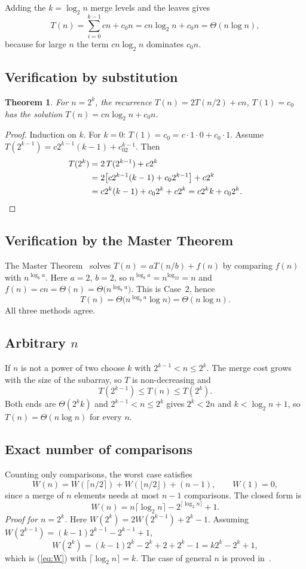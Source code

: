 \documentclass[11pt,a4paper]{article}
\theoremstyle{plain}
\newtheorem{theorem}{Theorem}
\theoremstyle{definition}
\renewcommand{\lg}{\log_2}
\begin{document}
Adding the $k=\lg n$ merge levels and the leaves gives
\[
  T(n)=\sum_{i=0}^{k-1}cn+c_0n=cn\lg n+c_0n=\Theta(n\log n),
\]
because for large $n$ the term $cn\lg n$ dominates $c_0n$.

\subsection{Verification by substitution}
\begin{theorem}\label{thm:subst}
For $n=2^k$, the recurrence $T(n)=2T(n/2)+cn$, $T(1)=c_0$ has the solution $T(n)=cn\lg n+c_0n$.
\end{theorem}
\begin{proof}
Induction on $k$. For $k=0$: $T(1)=c_0=c\cdot1\cdot0+c_0\cdot1$. Assume $T(2^{k-1})=c2^{k-1}(k-1)+c_02^{k-1}$. Then
\begin{align*}
T(2^k)&=2\,T(2^{k-1})+c2^k\\
&=2\bigl[c2^{k-1}(k-1)+c_02^{k-1}\bigr]+c2^k\\
&=c2^k(k-1)+c_02^k+c2^k=c2^kk+c_02^k. \qedhere
\end{align*}
\end{proof}

\subsection{Verification by the Master Theorem}
The Master Theorem~\cite{clrs,bentley} solves $T(n)=aT(n/b)+f(n)$ by comparing $f(n)$ with $n^{\log_ba}$. Here $a=2$, $b=2$, so $n^{\log_ba}=n^{\log_22}=n$ and $f(n)=cn=\Theta(n)=\Theta\bigl(n^{\log_ba}\bigr)$. This is Case~2, hence
\[
  T(n)=\Theta\bigl(n^{\log_ba}\log n\bigr)=\Theta(n\log n).
\]
All three methods agree.

\subsection{Arbitrary $n$}
If $n$ is not a power of two choose $k$ with $2^{k-1}<n\le2^k$. The merge cost grows with the size of the subarray, so $T$ is non-decreasing and
\[
  T(2^{k-1})\le T(n)\le T(2^k).
\]
Both ends are $\Theta(2^k k)$ and $2^{k-1}<n\le2^k$ gives $2^k<2n$ and $k<\lg n+1$, so $T(n)=\Theta(n\log n)$ for every $n$.

\subsection{Exact number of comparisons}
Counting only comparisons, the worst case satisfies
\[
  W(n)=W(\lceil n/2\rceil)+W(\lfloor n/2\rfloor)+(n-1),\qquad W(1)=0,
\]
since a merge of $n$ elements needs at most $n-1$ comparisons. The closed form is
\begin{equation}
  W(n)=n\lceil\lg n\rceil-2^{\lceil\lg n\rceil}+1.
  \label{eq:W}
\end{equation}
\emph{Proof for $n=2^k$.} Here $W(2^k)=2W(2^{k-1})+2^k-1$. Assuming $W(2^{k-1})=(k-1)2^{k-1}-2^{k-1}+1$,
\[
  W(2^k)=(k-1)2^k-2^k+2+2^k-1=k2^k-2^k+1,
\]
which is (\ref{eq:W}) with $\lceil\lg n\rceil=k$. The case of general $n$ is proved in~\cite{knuth3}.
\end{document}
